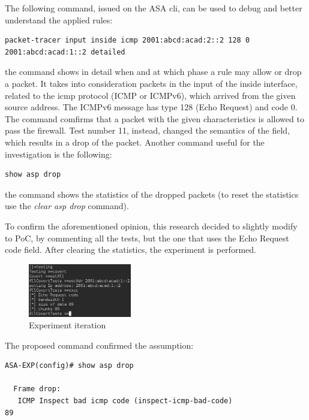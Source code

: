 \documentclass[12pt]{article}
\begin{document}
The following command, issued on the ASA cli, can be used to debug and better understand the applied rules:

\begin{lstlisting}[style=python,basicstyle=\ttfamily\small]
 packet-tracer input inside icmp 2001:abcd:acad:2::2 128 0 2001:abcd:acad:1::2 detailed
\end{lstlisting}

the command shows in detail when and at which phase a rule may allow or drop a packet. It takes into consideration packets in the input of the inside interface, related to the icmp protocol (ICMP or ICMPv6), which arrived from the given source address. The ICMPv6 message has type 128 (Echo Request) and code 0. The command comfirms that a packet with the given characteristics is allowed to pass the firewall. Test number 11, instead, changed the semantics of the field, which results in a drop of the packet. Another command useful for the investigation is the following:

\begin{lstlisting}[style=python,basicstyle=\ttfamily\small]
 show asp drop
\end{lstlisting}
\vspace{-10pt}
the command shows the statistics of the dropped packets (to reset the statistics use the \textit{clear asp drop} command).

To confirm the aforementioned opinion, this research decided to slightly modify to PoC, by commenting all the tests, but the one that uses the Echo Request code field. After clearing the statistics, the experiment is performed. 

\begin{figure}[ht] 
\begin{center}
\includegraphics[width=0.4\textwidth]{echoCodeOnly}
\caption{Experiment iteration}
\label{fig:expIteration}
\end{center}
\end{figure}

The proposed command confirmed the assumption:

\begin{lstlisting}[style=python,basicstyle=\ttfamily\small]
 ASA-EXP(config)# show asp drop

  Frame drop:
   ICMP Inspect bad icmp code (inspect-icmp-bad-code)                          89
\end{lstlisting}
\end{document}
